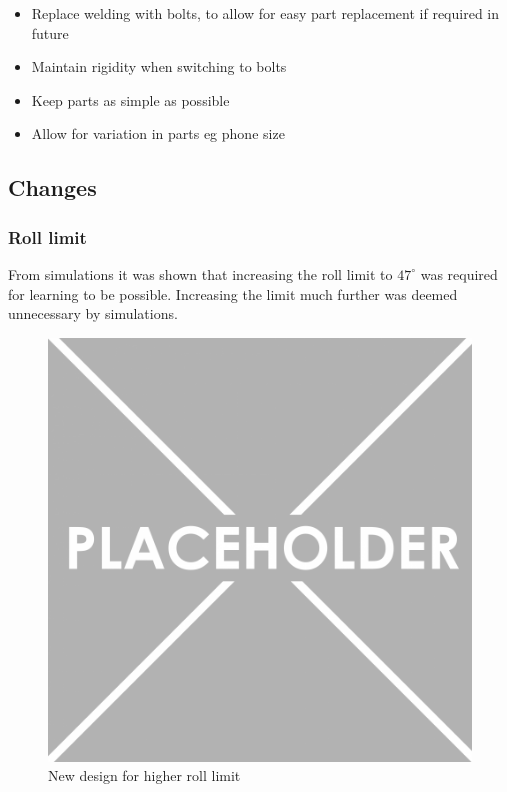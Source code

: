 \documentclass[twoside,twocolumn,12pt]{article}
\begin{document}
\begin{itemize}
\item Replace welding with bolts, to allow for easy part replacement if required in future
\item Maintain rigidity when switching to bolts
\item Keep parts as simple as possible
\item Allow for variation in parts eg phone size
\end{itemize}

\subsection{Changes}
\subsubsection{Roll limit}
From simulations it was shown that increasing the roll limit to $47^{\circ}$ was required for learning to be possible. Increasing the limit much further was deemed unnecessary by simulations.

\begin{figure}
  \centering
    \includegraphics[width=\linewidth]{place}
  \caption{New design for higher roll limit}
  \label{fig:newline}
\end{figure}
\end{document}

